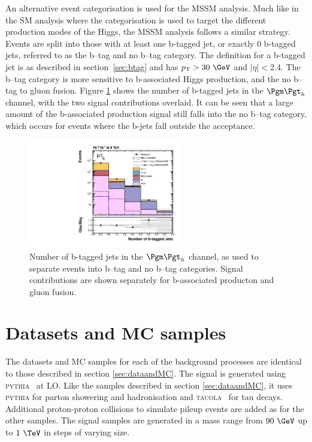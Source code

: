 An alternative event categorisation is used for the \ac{MSSM} analysis. Much
like in the \ac{SM} analysis where the categorisation is used to target the different 
production modes of the Higgs, the \ac{MSSM} analysis follows a similar
strategy. Events are split into those with at least one b-tagged jet, or exactly
0 b-tagged jets, referred to as the b--tag and no b--tag category.  The
definition for a b-tagged jet is as described in section~\ref{sec:btag} and has
$\pt > 30~\GeV$ and $|\eta| < 2.4$. The b--tag
category is more sensitive to b-associated Higgs production, and the no b--tag
to gluon fusion. Figure \ref{fig:nbtag} shows the number of b-tagged jets in the
$\mutau$ channel, with the two signal contributions overlaid. It can be seen
that a large amount of the b-associated production signal still falls into the
no b--tag category, which occurs for events where the b-jets fall outside the
acceptance.

\begin{figure}[tbh]
\includegraphics[width=0.6\textwidth]{plots/htt-mssm/n_bjets_inclusive_mt_2012_log.pdf}

\caption{Number of b-tagged jets in the $\mutau$ channel, as used to separate
events into b--tag and no b--tag categories. Signal contributions are shown
separately for b-associated producton and gluon fusion.}
\label{fig:nbtag}
\end{figure}

\section{Datasets and \ac{MC} samples}
\label{sec:mssmdataandMC}

The datasets and \ac{MC} samples for each of the background processes are
identical to those described in section \ref{sec:dataandMC}. The signal is
generated using \textsc{pythia}~\cite{Sjostrand:2006za} at \ac{LO}. Like the
samples described in section \ref{sec:dataandMC}, it uses \textsc{pythia}
for parton showering and hadronisation and \textsc{tauola}~\cite{TAUOLA} for tau
decays. Additional proton-proton collisions to simulate pileup events are added
as for the other samples. The signal samples are generated in a mass range from
$90~\GeV$ up to $1~\TeV$ in steps of varying size. 

